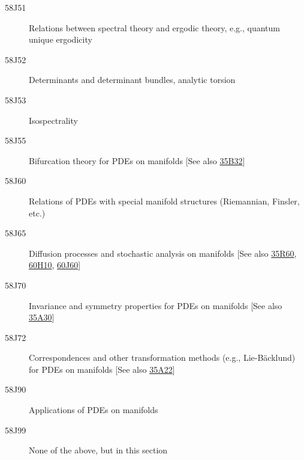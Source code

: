 \documentclass[letterpaper]{article}
\begin{document}
\begin{description}
\item [58J51]\label{58J51} Relations between spectral theory and ergodic theory, e.g., quantum unique ergodicity
\item [58J52]\label{58J52} Determinants and determinant bundles, analytic torsion
\item [58J53]\label{58J53} Isospectrality
\item [58J55]\label{58J55} Bifurcation theory for PDEs on manifolds [See also \hyperref[35B32]{35B32}]
\item [58J60]\label{58J60} Relations of PDEs with special manifold structures (Riemannian, Finsler, etc.)
\item [58J65]\label{58J65} Diffusion processes and stochastic analysis on manifolds [See also \hyperref[35R60]{35R60}, \hyperref[60H10]{60H10}, \hyperref[60J60]{60J60}]
\item [58J70]\label{58J70} Invariance and symmetry properties for PDEs on manifolds [See also \hyperref[35A30]{35A30}]
\item [58J72]\label{58J72} Correspondences and other transformation methods (e.g., Lie-B\"{a}cklund) for PDEs on manifolds [See also \hyperref[35A22]{35A22}]
\item [58J90]\label{58J90} Applications of PDEs on manifolds
\item [58J99]\label{58J99} None of the above, but in this section
\end{description}
\end{document}
